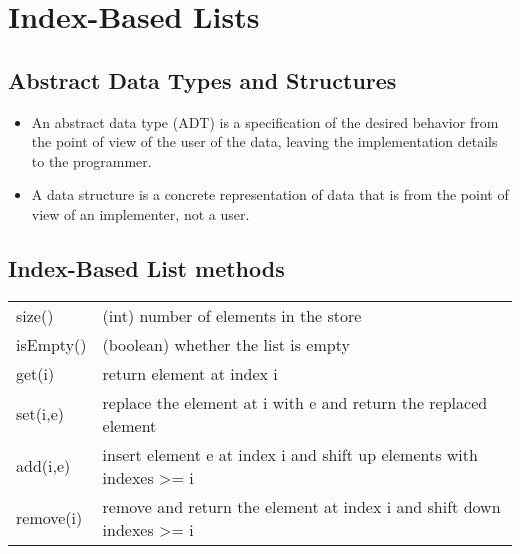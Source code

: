 \documentclass[12pt]{article}
\newcommand{\1}{\space \quad}
\newcommand{\2}{\quad \quad \quad}
\newcommand{\3}{\quad \quad \quad \quad \space}
\newcommand{\4}{\quad \quad \quad \quad \quad \quad}
\begin{document}
\section{Index-Based Lists}
\subsection{Abstract Data Types and Structures}
\begin{itemize}
    \item An abstract data type (ADT) is a specification of the desired behavior from the point of view 
    of the user of the data, leaving the implementation details to the programmer.
    \item A data structure is a concrete representation of data that is from the point 
    of view of an implementer, not a user.
\end{itemize}

\subsection{Index-Based List methods}
\begin{tabular}{|l|l|}
  \hline
  \rowcolor{myBlue}
  \color{white}{\textbf{Method}} & \color{white}{\textbf{Description}} \\
  \hline
  size() & (int) number of elements in the store \hspace{190pt} \\
  \hline
  isEmpty() & (boolean) whether the list is empty \\
  \hline
  get(i) & return element at index i \\
  \hline
  set(i,e) & replace the element at i with e and return the replaced element\\
  \hline
  add(i,e) & insert element e at index i and shift up elements with indexes >= i \\
  \hline
  remove(i) & remove and return the element at index i and shift down indexes >= i\\
  \hline
\end{tabular}
\end{document}
